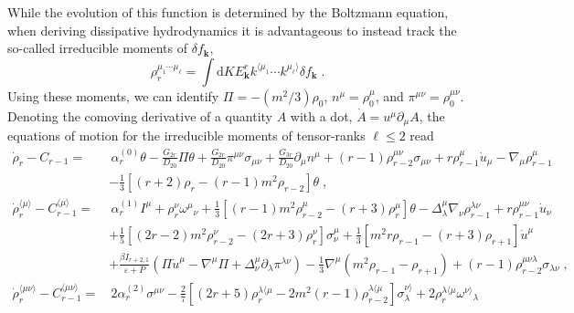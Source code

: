 \documentclass[a4paper, amsfonts, amssymb, amsmath, reprint, showkeys, nofootinbib, twoside, onecolumn,notitlepage]{revtex4-2}
\renewcommand{\d}{\mathrm{d}}
\renewcommand{\k}{\mathbf{k}}
\begin{document}
While the evolution of this function is determined by the Boltzmann equation, when deriving dissipative hydrodynamics it is advantageous to instead track the so-called irreducible moments of $\delta f_\k$,
\begin{equation}
    \rho_r^{\mu_1\cdots \mu_\ell}= \int \d K  E_\k^{r} k^{\langle\mu_1}\cdots k^{\mu_\ell\rangle} \delta f_\k\;.
\end{equation}
Using these moments, we can identify $\Pi=-(m^2/3)\rho_0$, $n^\mu=\rho_0^\mu$, and $\pi^{\mu\nu}=\rho_0^{\mu\nu}$.
Denoting the comoving derivative of a quantity $A$ with a dot, $\dot{A}=u^\mu \partial_\mu A$, the equations of motion for the irreducible moments of tensor-ranks $\ell\leq 2$ read \cite{Denicol2012Boltzmann}
\begin{subequations}\label{eq:rhodot_all}
\begin{align}
 \dot{\rho}_r - C_{r-1} =&\, \alpha_r^{(0)} \theta -
 \frac{G_{2r}}{D_{20}} \Pi \theta + 
 \frac{G_{2r}}{D_{20}} \pi^{\mu\nu} \sigma_{\mu\nu} + 
 \frac{G_{3r}}{D_{20}} \partial_\mu n^\mu
 + (r - 1) \rho^{\mu\nu}_{r-2} \sigma_{\mu\nu} + 
 r \rho^\mu_{r-1} \dot{u}_\mu - \nabla_\mu \rho^\mu_{r-1}\nonumber\\
 &- \frac{1}{3}\left[(r+2) \rho_r - (r -1)m^2 \rho_{r-2}\right]
 \theta\;, \label{eq:rhodot_l0}\\
%
 \dot{\rho}^{\langle\mu\rangle}_r - C_{r-1}^{\langle \mu \rangle} =&\, \alpha_r^{(1)} I^\mu + 
 \rho^\nu_r \omega^\mu{}_\nu + 
 \frac{1}{3}[(r-1) m^2 \rho^\mu_{r-2} - (r+ 3) \rho^\mu_r] \theta 
 - \Delta^\mu_\lambda \nabla_\nu \rho^{\lambda \nu}_{r-1} 
 + r \rho^{\mu\nu}_{r-1} \dot{u}_\nu \nonumber\\
 &+ \frac{1}{5} \left[(2r-2) m^2 \rho^\nu_{r-2} - (2r+3) \rho^\nu_r\right] \sigma^\mu_\nu 
 + \frac{1}{3}\left[m^2 r \rho_{r-1} - (r+3) \rho_{r+1}\right] \dot{u}^\mu \nonumber\\
 &+ \frac{\beta I_{r+2,1}}{\varepsilon + P} 
 (\Pi \dot{u}^\mu - \nabla^\mu \Pi + \Delta^\mu_\nu \partial_\lambda \pi^{\lambda \nu}) 
 -\frac{1}{3} \nabla^\mu (m^2 \rho_{r-1} - \rho_{r+1}) 
 + (r -1 ) \rho^{\mu\nu\lambda}_{r-2} \sigma_{\lambda\nu}\;,
 \label{eq:rhodot_l1} \\
 \dot{\rho}^{\langle \mu\nu\rangle}_r - C^{\langle \mu\nu \rangle}_{r-1} =& \,
 2 \alpha^{(2)}_r \sigma^{\mu\nu} - \frac{2}{7} \left[(2r+5) \rho^{\lambda\langle \mu}_r - 2m^2(r-1) \rho^{\lambda\langle \mu}_{r-2}\right] \sigma^{\nu\rangle}_\lambda + 
 2\rho^{\lambda\langle \mu}_r \omega^{\nu\rangle}{}_\lambda \nonumber\\

\end{align}
\end{subequations}
\end{document}
